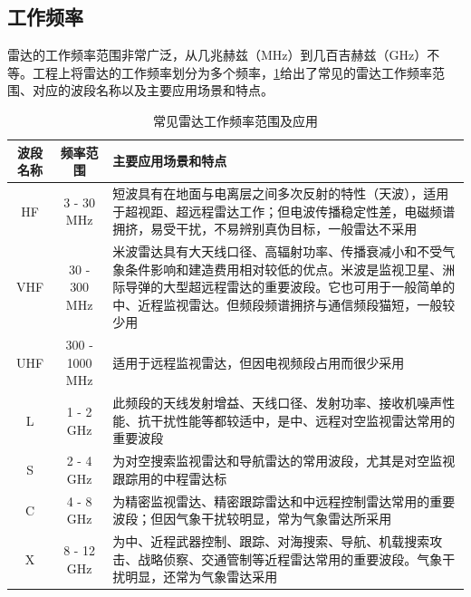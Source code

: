 \subsection{工作频率}

雷达的工作频率范围非常广泛，从几兆赫兹（MHz）到几百吉赫兹（GHz）不等。工程上将雷达的工作频率划分为多个频率，\cref{tab_chp1_radar_frequency}给出了常见的雷达工作频率范围、对应的波段名称以及主要应用场景和特点。

\begin{table}[htb!]
    \centering
    \caption{常见雷达工作频率范围及应用}
    \label{tab_chp1_radar_frequency}
    \small
    \begin{tabular}{c|c|p{7cm}}
        \hline
        波段名称 & 频率范围           & 主要应用场景和特点                                                                                                      \\
        \hline
        \hline
        HF   & 3 - 30 MHz     & 短波具有在地面与电离层之间多次反射的特性（天波），适用于超视距、超远程雷达工作；但电波传播稳定性差，电磁频谱拥挤，易受干扰，不易辨别真伪目标，一般雷达不采用
        \\
        \hline
        VHF  & 30 - 300 MHz   & 米波雷达具有大天线口径、高辐射功率、传播衰减小和不受气象条件影响和建造费用相对较低的优点。米波是监视卫星、洲际导弹的大型超远程雷达的重要波段。它也可用于一般简单的中、近程监视雷达。但频段频谱拥挤与通信频段猫短，一般较少用 \\ \hline
        UHF  & 300 - 1000 MHz & 适用于远程监视雷达，但因电视频段占用而很少采用                                                                                        \\
        \hline
        L    & 1 - 2 GHz      & 此频段的天线发射增益、天线口径、发射功率、接收机噪声性能、抗干扰性能等都较适中，是中、远程对空监视雷达常用的重要波段                                                     \\
        \hline
        S    & 2 - 4 GHz      & 为对空搜索监视雷达和导航雷达的常用波段，尤其是对空监视跟踪用的中程雷达标                                                                           \\
        \hline
        C    & 4 - 8 GHz      & 为精密监视雷达、精密跟踪雷达和中远程控制雷达常用的重要波段；但因气象干扰较明显，常为气象雷达所采用                                                              \\
        \hline
        X    & 8 - 12 GHz     & 为中、近程武器控制、跟踪、对海搜索、导航、机载搜索攻击、战略侦察、交通管制等近程雷达常用的重要波段。气象干扰明显，还常为气象雷达采用                                             \\

\end{tabular}
\end{table}
